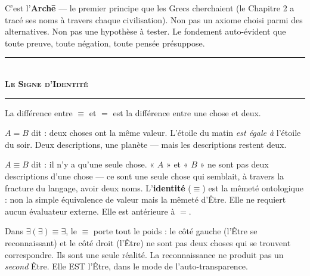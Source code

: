 \documentclass[10pt, openany, oneside]{book}
\renewcommand{\normalsize}{\fontsize{10}{13}\selectfont}
\begin{document}
C'est l'\textbf{Arch\={e}} --- le premier principe que les Grecs cherchaient (le Chapitre 2 a tracé ses noms à travers chaque civilisation). Non pas un axiome choisi parmi des alternatives. Non pas une hypothèse à tester. Le fondement auto-évident que toute preuve, toute négation, toute pensée présuppose.

\vspace{1.5em}


\begin{center}
    \rule{0.3\textwidth}{0.4pt}\\[0.5em]
    {\normalsize\bfseries\scshape Le Signe d'Identité}\\[0.3em]
    \rule{0.3\textwidth}{0.4pt}
\end{center}

\vspace{1em}

\noindent La différence entre $\equiv$ et $=$ est la différence entre une chose et deux.

$A = B$ dit : deux choses ont la même valeur. L'étoile du matin \textit{est égale à} l'étoile du soir. Deux descriptions, une planète --- mais les descriptions restent deux.

$A \equiv B$ dit : il n'y a qu'une seule chose. « $A$ » et « $B$ » ne sont pas deux descriptions d'une chose --- ce sont une seule chose qui semblait, à travers la fracture du langage, avoir deux noms. L'\textbf{identité} ($\equiv$) est la mêmeté ontologique : non la simple équivalence de valeur mais la mêmeté d'Être. Elle ne requiert aucun évaluateur externe. Elle est antérieure à $=$.

Dans $\exists(\exists) \equiv \exists$, le $\equiv$ porte tout le poids : le côté gauche (l'Être se reconnaissant) et le côté droit (l'Être) ne sont pas deux choses qui se trouvent correspondre. Ils sont une seule réalité. La reconnaissance ne produit pas un \textit{second} Être. Elle EST l'Être, dans le mode de l'auto-transparence.
\end{document}

